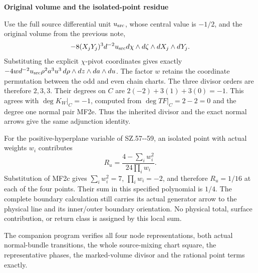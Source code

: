 \medskip\noindent\textbf{Original volume and the isolated-point residue}

\par\nobreak

Use the full source differential unit \(u_{\rm src}\), whose central
value is \(-1/2\), and the original volume from the previous note,
\[
 -8(X_jY_j)^3d^{-2}u_{\rm src}
       d\chi\wedge d\zeta\wedge dX_j\wedge dY_j.
\]
Substituting the explicit \(\chi\)-pivot coordinates gives exactly
\(-4w d^{-2}u_{\rm src}\rho^2a^3u^3\,
d\rho\wedge dz\wedge da\wedge du\). The factor \(w\) retains
the coordinate permutation between the odd and even chain charts.
The three divisor orders are therefore \(2,3,3\). Their degrees
on \(C\) are \(2(-2)+3(1)+3(0)=-1\). This agrees with
\(\deg K_W|_C=-1\), computed from \(\deg T F|_C=2-2=0\)
and the degree one normal pair MF2e. Thus the inherited divisor and
the exact normal arrows give the same adjunction identity.

For the positive-hyperplane variable of SZ.57-\/-59, an isolated point
with actual weights \(w_i\) contributes
\[
 R_u=\frac{4-\sum_i w_i^2}{24\prod_i w_i}.
\]
Substitution of MF2c gives \(\sum_iw_i^2=7\),
\(\prod_iw_i=-2\), and therefore \(R_u=1/16\) at each of
the four points. Their sum in this specified polynomial is \(1/4\).
The complete boundary calculation still carries its actual generator
arrow to the physical line and its inner/outer boundary orientation.
No physical total, surface contribution, or return class is assigned
by this local sum.

The companion program
 verifies all four
node representations, both actual normal-bundle transitions, the
whole source-mixing chart square, the representative phases, the
marked-volume divisor and the rational point terms exactly.

